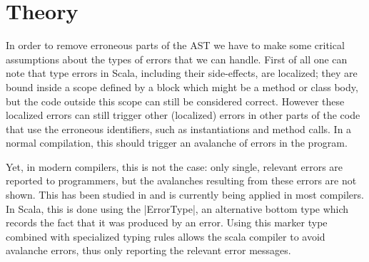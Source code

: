 \section{Theory}


In order to remove erroneous parts of the AST we have to make some critical assumptions about the types of errors that we can handle. First of all one can note that type errors in Scala, including their side-effects, are localized; they are bound inside a scope defined by a block which might be a method or class body, but the code outside this scope can still be considered correct. However these localized errors can still trigger other (localized) errors in other parts of the code that use the erroneous identifiers, such as instantiations and method calls. In a normal compilation, this should trigger an avalanche of errors in the program.

Yet, in modern compilers, this is not the case: only single, relevant errors are reported to programmers, but the avalanches resulting from these errors are not shown. This has been studied in \cite{spurious} and is currently being applied in most compilers. In Scala, this is done using the |ErrorType|, an alternative bottom type which records the fact that it was produced by an error. Using this marker type combined with specialized typing rules allows the scala compiler to avoid avalanche errors, thus only reporting the relevant error messages.

